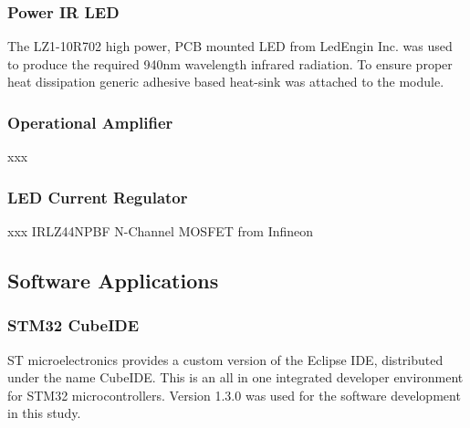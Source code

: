 


\subsubsection{Power IR LED}

The LZ1-10R702 high power, PCB mounted LED from LedEngin Inc. was used to produce the required 940nm wavelength infrared radiation. To ensure proper heat dissipation generic adhesive based heat-sink was attached to the module.

\subsubsection{Operational Amplifier}
xxx

\subsubsection{LED Current Regulator}
xxx
IRLZ44NPBF N-Channel MOSFET from Infineon




\subsection{Software Applications}

\subsubsection{STM32 CubeIDE}
ST microelectronics provides a custom version of the Eclipse IDE, distributed under the name CubeIDE. This is an all in one integrated developer environment for STM32 microcontrollers. Version 1.3.0 was used for the software development in this study.

